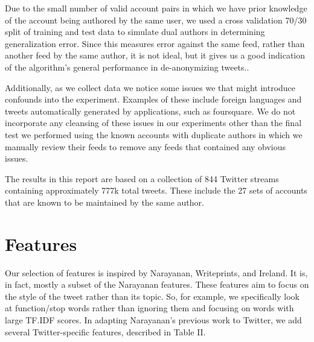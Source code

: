 \documentclass[10pt, conference, compsocconf]{IEEEtran}
\begin{document}
Due to the small number of valid account pairs in which we have prior
knowledge of the account being authored by the same user, we used  a cross
validation 70/30 split of training and test data to simulate dual authors in determining generalization error. Since
this measures error against the same feed, rather than another feed by
the same author, it is not ideal, but it gives us a good indication of the algorithm's general performance in de-anonymizing tweets..

Additionally, as we collect data we notice some issues
we that might introduce confounds into the
experiment. Examples of these include foreign languages and tweets
automatically generated by applications, such as foursquare. We do not incorporate any cleansing of these issues in our experiments other than the final test we performed using the known accounts with duplicate authors in which we manually review their feeds to remove any feeds that contained any obvious issues.

The results in this report are based on a collection of 844 Twitter
streams containing approximately 777k total tweets. These include the
27 sets of accounts that are known to be maintained by the same
author.

\section{Features}

Our selection of features is inspired by Narayanan\cite{Narayanan},
Writeprints\cite{Abbasi}, and Ireland\cite{Ireland}. It is, in fact,
mostly a subset of the Narayanan features. These features aim to focus
on the style of the tweet rather than its topic. So, for example, we
specifically look at function/stop words rather than ignoring them and
focusing on words with large TF.IDF scores. In adapting Narayanan's
previous work to Twitter, we add several Twitter-specific features,
described in Table II.
\end{document}
